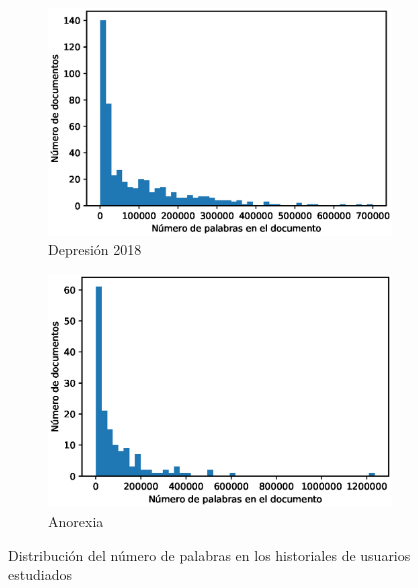 
\begin{figure}[!ht]
    
    \begin{subfigure}[b]{0.5\textwidth}
        \includegraphics[width=\textwidth]{sections/figures/length_dist.eps}
        \caption{Depresión 2018}
    \end{subfigure}
    \hfill
    \begin{subfigure}[b]{0.5\textwidth}
        \includegraphics[width=\textwidth]{sections/figures/length_dist_anorexia.eps}
        \caption{Anorexia}
    \end{subfigure}
    \caption{Distribución del número de palabras en los historiales de usuarios estudiados}
    \label{fig:erisk_freq}
\end{figure}

